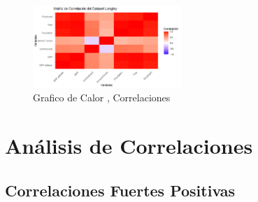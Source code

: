 \documentclass{article}
\begin{document}
    \begin{figure}[h] %
        \centering %
        \includegraphics[width=0.5\textwidth]{Correlacion.png}
        \caption{Grafico de Calor , Correlaciones } %
        \label{fig:mi_imagen} %
        \vspace{0.5cm} %
    \end{figure}

    \section{Análisis de Correlaciones}

    \subsection{Correlaciones Fuertes Positivas}
    
\end{document}
